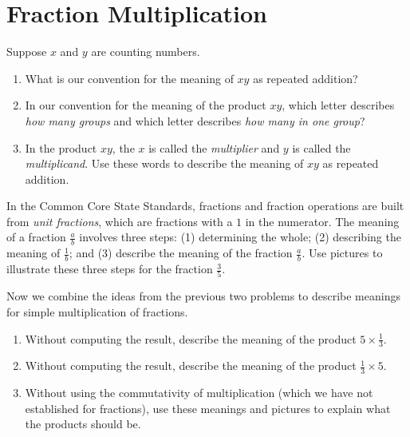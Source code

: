 \newpage
\section{Fraction Multiplication}\label{A:fractionMultiplication}



\begin{prob}
Suppose $x$ and $y$ are counting numbers.  
\begin{enumerate}
\item What is our convention for the meaning of $xy$ as repeated addition?  
\item In our convention for the meaning of the product $xy$, which letter describes 
\emph{how many groups} and which letter describes \emph{how many in one group}? 
\item In the product $xy$, the $x$ is called the \emph{multiplier} and $y$ is called the \emph{multiplicand}.  
Use these words to describe the meaning of $xy$ as repeated addition. 
\end{enumerate}
\end{prob}

\vspace{1in}

\begin{prob}
In the Common Core State Standards, fractions and fraction operations are built from \emph{unit fractions}, which are fractions with a $1$ in the numerator.  The meaning of a fraction $\frac{a}{b}$ involves three steps: (1) determining the whole; (2) describing the meaning of $\frac{1}{b}$; and (3) describe the meaning of the fraction $\frac{a}{b}$.  Use pictures to illustrate these three steps for the fraction
$\frac{3}{5}$.  
\end{prob}

\vspace{1in}

\begin{prob}
Now we combine the ideas from the previous two problems to describe meanings for simple multiplication of fractions.  
\begin{enumerate}
\item Without computing the result, describe the meaning of the product $5 \times \frac{1}{3}$.
\item Without computing the result, describe the meaning of the product $\frac{1}{3}\times 5$.
\item Without using the commutativity of multiplication (which we have not established for fractions), 
use these meanings and pictures to explain what the products should be. 
\end{enumerate}
\end{prob}

